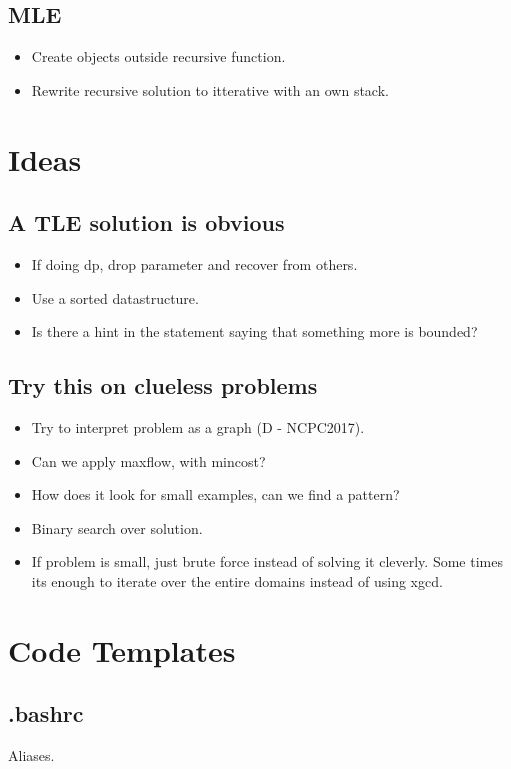\documentclass[8pt,a4paper,landscape,oneside]{amsart}
\newcommand{\codeb}[1]{\inputminted[fontsize=\large,tabsize=2,baselinestretch=1]{bash}{code/#1}}
\begin{document}
\begin{multicols*}{2}
\begin{large}
    \subsection{MLE}
        \begin{itemize}
        \item Create objects outside recursive function.
        \item Rewrite recursive solution to itterative with an own stack.
        \end{itemize}
\section{Ideas}
    \subsection{A TLE solution is obvious}
        \begin{itemize}
        \item If doing dp, drop parameter and recover from others.
        \item Use a sorted datastructure.
        \item Is there a hint in the statement saying that something more is bounded?
        \end{itemize}
    \subsection{Try this on clueless problems}
        \begin{itemize}
        \item Try to interpret problem as a graph (D - NCPC2017).
        \item Can we apply maxflow, with mincost?
        \item How does it look for small examples, can we find a pattern?
        \item Binary search over solution.
        \item If problem is small, just brute force instead of solving it cleverly.
            Some times its enough to iterate over the entire domains instead of using xgcd.
        \end{itemize}
\section{Code Templates}
    \subsection{.bashrc}
        Aliases.
        \codeb{.bashrc}

\end{large}
\end{multicols*}
\end{document}
